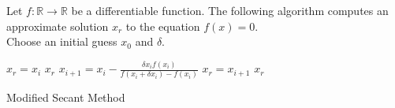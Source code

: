\begin{algorithm}\label{alg:c3}
Let $f:\mathbb{R}\rightarrow\mathbb{R}$ be a differentiable function. The following algorithm computes an approximate solution $x_{r}$ to the equation $f(x)=0$.\\
Choose an initial guess $x_{0}$ and $\delta$.
\begin{algorithmic}
    \State $x_{r}=x_{i}$
    \State \Return $x_{r}$
  \EndIf
  \State $x_{i+1}=x_{i}-\frac{\delta x_{i}f(x_{i})}{f(x_{i}+\delta x_{i})-f(x_{i})}$
    \State $x_{r}=x_{i+1}$
    \State \Return $x_{r}$
  \EndIf
\EndFor
\end{algorithmic}
\caption{Modified Secant Method}
\end{algorithm}
